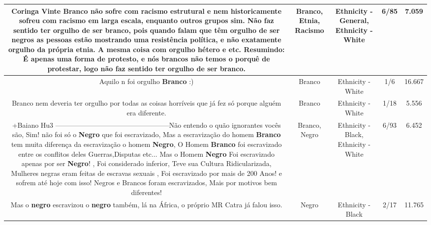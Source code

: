 \documentclass[11pt]{article}
\newlength\mylength
\begin{document}
\begin{center}
\begin{longtable}{|C{.65\mylength}|C{.30\mylength}|C{.12\mylength}|C{.12\mylength}|C{.12\mylength}|}
  \small Coringa Vinte \textbf{Branco} não sofre com \textbf{racismo} estrutural e nem historicamente sofreu com \textbf{racismo} em larga escala, enquanto outros grupos sim. Não faz sentido ter orgulho de ser \textbf{branco}, pois quando falam que têm orgulho de ser negros as pessoas estão mostrando uma resistência política, e não exatamente orgulho da própria \textbf{etnia}. A mesma coisa com orgulho hétero e etc. Resumindo: É apenas uma forma de protesto, e nós brancos não temos o porquê de protestar, logo não faz sentido ter orgulho de ser \textbf{branco}.\normalsize   & Branco, Etnia, Racismo & Ethnicity - General, Ethnicity - White & 6/85 & 7.059 \\  \hline
  \small Aquilo n foi orgulho \textbf{Branco} :)\normalsize   & Branco & Ethnicity - White & 1/6 & 16.667 \\  \hline
  \small Branco nem deveria ter orgulho por todas as coisas horríveis que já fez só porque alguém era diferente.\normalsize   & Branco & Ethnicity - White & 1/18 & 5.556 \\  \hline
  \small +Baiano Hu3 --------------------------------------------------Não entendo o quão ignorantes vocês são, Sim! não foi só o \textbf{Negro} que foi escravizado, Mas a escravização do homem \textbf{Branco} tem muita diferença da escravização o homem \textbf{Negro}, O Homem \textbf{Branco} foi escravizado entre os conflitos deles Guerras,Disputas etc... Mas o Homem \textbf{Negro} Foi escravizado apenas por ser \textbf{Negro}! , Foi considerado inferior, Teve sua Cultura Ridicularizada, Mulheres negras eram feitas de escravas sexuais , Foi escravizado por mais de 200 Anos! e sofrem até hoje com isso! Negros e Brancos foram escravizados, Mais por motivos bem diferentes!\normalsize   & Branco, Negro & Ethnicity - Black, Ethnicity - White & 6/93 & 6.452 \\  \hline
  \small Mas o \textbf{negro} escravizou o \textbf{negro} também, lá na África, o próprio MR Catra já falou isso.\normalsize   & Negro & Ethnicity - Black & 2/17 & 11.765 \\  \hline

\end{longtable}
\end{center}
\end{document}
